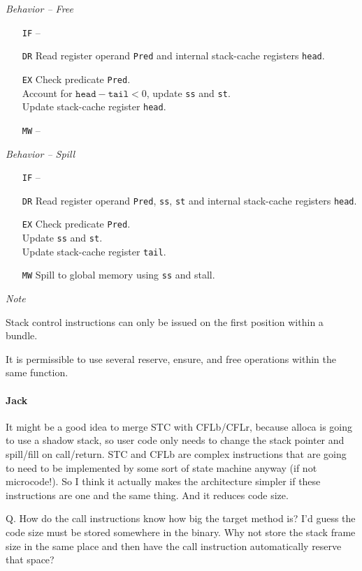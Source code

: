 \documentclass{IEEEtran}
\newcommand{\comment}[3]{\paragraph*{\textbf{#1}}{\color{#3}#2}}
\newcommand{\jack}[1]{\comment{Jack}{#1}{Magenta}}
\begin{document}
\vspace{7mm}
\emph{Behavior -- Free}
\begin{itemize}
  \item[\texttt{IF}] --
  \item[\texttt{DR}] Read register operand \texttt{Pred} and internal
                     stack-cache registers \texttt{head}.
  \item[\texttt{EX}] Check predicate \texttt{Pred}. \\
                     Account for $\mathtt{head} - \mathtt{tail} < 0$, update
                     \texttt{ss} and \texttt{st}. \\
                     Update stack-cache register \texttt{head}.
  \item[\texttt{MW}] --
\end{itemize}

\vspace{7mm}
\emph{Behavior -- Spill}
\begin{itemize}
  \item[\texttt{IF}] --
  \item[\texttt{DR}] Read register operand \texttt{Pred}, \texttt{ss}, \texttt{st} and internal
                     stack-cache registers \texttt{head}.
  \item[\texttt{EX}] Check predicate \texttt{Pred}. \\
                     Update \texttt{ss} and \texttt{st}. \\
                     Update stack-cache register \texttt{tail}.
  \item[\texttt{MW}] Spill to global memory using \texttt{ss} and
                     stall.
\end{itemize}

\vspace{7mm}
\emph{Note}

Stack control instructions can only be issued on the first position within a
bundle.

It is permissible to use several reserve, ensure, and free operations within the
same function.

\jack{It might be a good idea to merge STC with CFLb/CFLr, because
alloca is going to use a shadow stack, so user code only needs to
change the stack pointer and spill/fill on call/return. STC and CFLb
are complex instructions that are going to need to be implemented by
some sort of state machine anyway (if not microcode!). So I think it
actually makes the architecture simpler if these instructions are
one and the same thing. And it reduces code size.

Q. How do the call instructions know how big the target method
is? I'd guess the code size must be stored somewhere in the binary.
Why not store the stack frame size in the same place and then have the call
instruction automatically reserve that space?}
\end{document}
